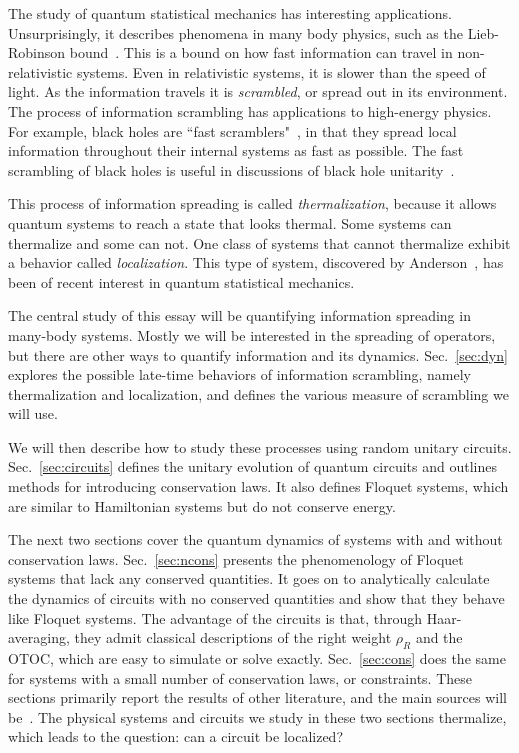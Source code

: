 \documentclass[a4paper,11pt]{article}
\begin{document}
The study of quantum statistical mechanics has interesting applications. Unsurprisingly, it describes phenomena in many body physics, such as the Lieb-Robinson bound~\cite{Lieb72, RobertsSwingle}. This is a bound on how fast information can travel in non-relativistic systems. Even in relativistic systems, it is slower than the speed of light. As the information travels it is \emph{scrambled}, or spread out in its environment. The process of information scrambling has applications to high-energy physics. For example, black holes are ``fast scramblers"~\cite{SekinoSusskind}, in that they spread local information throughout their internal systems as fast as possible. The fast scrambling of black holes is useful in discussions of black hole unitarity~\cite{HaydenPreskill}.

This process of information spreading is called \emph{thermalization}, because it allows quantum systems to reach a state that looks thermal. Some systems can thermalize and some can not. One class of systems that cannot thermalize exhibit a behavior called \emph{localization}. This type of system, discovered by Anderson~\cite{AndersonDiff}, has been of recent interest in quantum statistical mechanics.

The central study of this essay will be quantifying information spreading in many-body systems. Mostly we will be interested in the spreading of operators, but there are other ways to quantify information and its dynamics. Sec.~\ref{sec:dyn} explores the possible late-time behaviors of information scrambling, namely thermalization and localization, and defines the various measure of scrambling we will use.

We will then describe how to study these processes using random unitary circuits. Sec.~\ref{sec:circuits} defines the unitary evolution of quantum circuits and outlines methods for introducing conservation laws. It also defines Floquet systems, which are similar to Hamiltonian systems but do not conserve energy.

The next two sections cover the quantum dynamics of systems with and without conservation laws. Sec.~\ref{sec:ncons} presents the phenomenology of Floquet systems that lack any conserved quantities. It goes on to analytically calculate the dynamics of circuits with no conserved quantities and show that they behave like Floquet systems. The advantage of the circuits is that, through Haar-averaging, they admit classical descriptions of the right weight $\rho_R$ and the OTOC, which are easy to simulate or solve exactly.
Sec.~\ref{sec:cons} does the same for systems with a small number of conservation laws, or constraints. These sections primarily report the results of other literature, and the main sources will be~\cite{ChenOtoc, ZhangFloq, vonKeyserlingkHydro, NahumOpSp, KhemaniOpSp}. The physical systems and circuits we study in these two sections thermalize, which leads to the question: can a circuit be localized?
\end{document}
